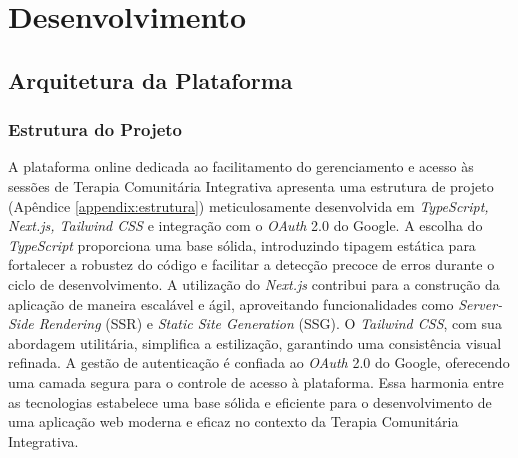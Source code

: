 \part{Desenvolvimento}
\chapter{Arquitetura da Plataforma}
\section{Estrutura do Projeto}

A plataforma online dedicada ao facilitamento do gerenciamento e acesso às sessões de Terapia Comunitária Integrativa apresenta uma estrutura de projeto (Apêndice \ref{appendix:estrutura}) meticulosamente desenvolvida em \textit{TypeScript, Next.js, Tailwind CSS} e integração com o \textit{OAuth} 2.0 do Google. A escolha do \textit{TypeScript} proporciona uma base sólida, introduzindo tipagem estática para fortalecer a robustez do código e facilitar a detecção precoce de erros durante o ciclo de desenvolvimento. A utilização do \textit{Next.js} contribui para a construção da aplicação de maneira escalável e ágil, aproveitando funcionalidades como \textit{Server-Side Rendering} (SSR) e \textit{Static Site Generation} (SSG). O \textit{Tailwind CSS}, com sua abordagem utilitária, simplifica a estilização, garantindo uma consistência visual refinada. A gestão de autenticação é confiada ao \textit{OAuth} 2.0 do Google, oferecendo uma camada segura para o controle de acesso à plataforma. Essa harmonia entre as tecnologias estabelece uma base sólida e eficiente para o desenvolvimento de uma aplicação web moderna e eficaz no contexto da Terapia Comunitária Integrativa.

